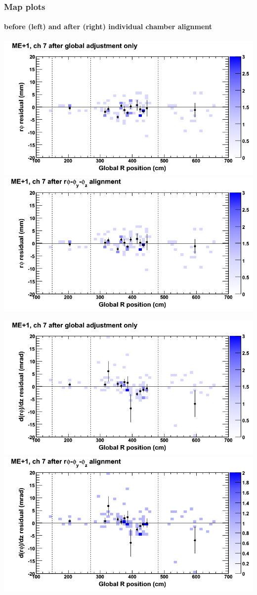 \documentclass[compress]{beamer}
\begin{document}
\begin{frame}
\frametitle{Map plots}
\framesubtitle{before (left) and after (right) individual chamber alignment}
\includegraphics[width=0.5\linewidth]{ringmapplots_3dof/before_CSCvsr_mep1ch07_x.png} \includegraphics[width=0.5\linewidth]{ringmapplots_3dof/after_CSCvsr_mep1ch07_x.png}

\includegraphics[width=0.5\linewidth]{ringmapplots_3dof/before_CSCvsr_mep1ch07_dxdz.png} \includegraphics[width=0.5\linewidth]{ringmapplots_3dof/after_CSCvsr_mep1ch07_dxdz.png}
\end{frame}
\end{document}
